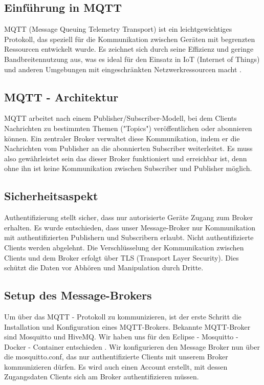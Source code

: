 
\subsection{Einführung in MQTT}
MQTT (Message Queuing Telemetry Transport) ist ein leichtgewichtiges Protokoll, das speziell für die 
Kommunikation zwischen Geräten mit begrenzten Ressourcen entwickelt wurde. Es zeichnet sich durch seine 
Effizienz und geringe Bandbreitennutzung aus, was es ideal für den Einsatz in IoT (Internet of Things) und 
anderen Umgebungen mit eingeschränkten Netzwerkressourcen macht \cite{MQTTWikiedia}.

\subsection{MQTT - Architektur}
MQTT arbeitet nach einem Publisher/Subscriber-Modell, bei dem Clients Nachrichten zu bestimmten
Themen ("Topics") veröffentlichen oder abonnieren können. Ein zentraler Broker verwaltet diese 
Kommunikation, indem er die Nachrichten vom Publisher an die abonnierten Subscriber weiterleitet. 
Es muss also gewährleistet sein das dieser Broker funktioniert und erreichbar ist, denn ohne ihn ist keine
Kommunikation zwischen Subscriber und Publisher möglich. 

\subsection{Sicherheitsaspekt}
Authentifizierung stellt sicher, dass nur autorisierte Geräte Zugang zum Broker erhalten. Es wurde entschieden, 
dass unser Message-Broker nur Kommunikation mit authentifizierten Publishern und Subscribern erlaubt. 
Nicht authentifizierte Clients werden abgelehnt.
Die Verschlüsselung der Kommunikation zwischen Clients und dem Broker erfolgt über TLS (Transport Layer Security).
Dies schützt die Daten vor Abhören und Manipulation durch Dritte.

\subsection{Setup des Message-Brokers}
Um über das MQTT - Protokoll zu kommunizieren, ist der erste Schritt die Installation und Konfiguration 
eines MQTT-Brokers. Bekannte MQTT-Broker sind Mosquitto und HiveMQ. Wir haben uns für den Eclipse - 
Mosquitto - Docker - Container entschieden \cite{eclipse_mosquitto_docker}. Wir konfigurieren den Message Broker
nun über die mosquitto.conf, das nur authentifizierte Clients mit unserem Broker kommunizieren dürfen.
Es wird auch einen Account erstellt, mit dessen Zugangsdaten Clients sich am Broker authentifizieren müssen.

